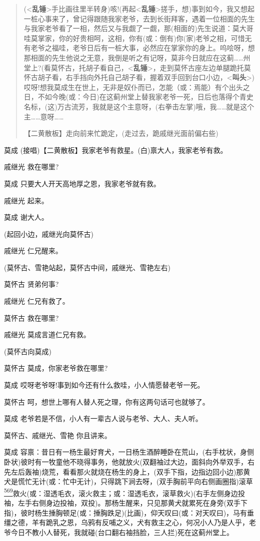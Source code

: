 \begin{quote}
(\textless{}\textbf{乱锤}\textgreater{}手比画往里半转身)咳!(再起\textless{}\textbf{乱锤}\textgreater{}搓手，想)事到如今，我又想起一桩心事来了，曾记得跟随我家老爷，去到长街拜客，遇着一位相面的先生与我家老爷看了一相，然后又与我觑了一觑，那(相面的)先生说道：莫大哥哇莫掌家，你的好贵相呵，这相，你有(或：倒有)你(家)老爷之相，可惜无有老爷之福哇，老爷日后有一桩大事，必然应在掌家你的身上。呜哙呀，想那相面的先生他说之无意，我倒是听之有记呀，莫非今日就应在这蓟\ldots{}\ldots{}州堂上?(看莫怀古，托胡子看自己，\textless{}\textbf{乱锤}\textgreater{}，走到莫怀古座左边单腿跪托莫怀古胡子看，右手挡向外托自己胡子看，握着双手回到台口小边，\textless{}\textbf{叫头}\textgreater{})哎呀!想我莫成生在世上，无非是奴仆而已，怎能（或：焉能）有个出头之日，不如今晚(或：今日)在这蓟州堂上替我家老爷一死，日后也落得个青史名标，(这)万古流芳，我就是这个主意呀，(右拳击左掌)哦，我\ldots{}\ldots{}就是这个主\ldots{}\ldots{}意呀\ldots{}\ldots{}

【二黄散板】走向前来忙跪定，(走过去，跪戚继光面前偏右些)
\end{quote}

莫成 (接唱)【二黄散板】我家老爷有救星。(白)禀大人，我家老爷有救。

戚继光 救在哪里?

莫成 只要大人开天高地厚之恩，我家老爷就有救。

戚继光 起来。

莫成 谢大人。

(起回小边，戚继光向莫怀古)

戚继光 仁兄醒来。

(莫怀古、雪艳站起，莫怀古中间，戚继光、雪艳左右)

莫怀古 贤弟何事?

戚继光 仁兄有救了。

莫怀古 救在哪里?

戚继光 莫成言道仁兄有救。

(莫怀古向莫成)

莫怀古 莫成，你家老爷救在哪里?

莫成 哎呀老爷呀!事到如今还有什么救哇，小人情愿替老爷一死。

莫怀古 呵，想世上哪有人替人死之理，你有这两句话可也就够了。

莫成 老爷若是不信，小人有一辈古人说与老爷、大人、夫人听。

莫怀古、戚继光、雪艳 你且讲来。

莫成
容禀：昔日有一杨生最好育犬，一日杨生酒醉睡卧在荒山，(右手枕状，身侧卧状)彼时有一牧童他不晓得事务，他就放火(双翻袖过大边，面斜向外举双手，右先左后轰袖)烧荒，看看那火就烧在杨生的身上，(双手下指，边指边回小边)那黄犬是慌忙无计(或：忙中无计)，只得跳下涧去呀，(双手胸前平向右侧画圈指)滚草\protect\hyperlink{fn569}{\textsuperscript{569}}救火(或：湿透毛衣，滚火救主；或：湿透毛衣，滚草救火)(右手左侧身边投袖，左手右侧身边投袖，双投)。那杨生醒来，只见那黄犬就累死在身旁(双手下指)，彼时杨生捶胸顿足(或：捶胸跌足)(比画)，仰天叹曰(或：对天叹曰)，马有垂缰之德，羊有跪乳之恩，乌鸦有反哺之义，犬有救主之心，何况小人乃是人乎，老爷今日不教小人替死，我就碰(台口翻右袖挡脸，三人拦)死在这蓟州堂上。

